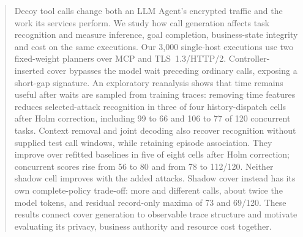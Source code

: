 \begin{abstract}
Decoy tool calls change both an LLM Agent's encrypted traffic and the work its services perform. We study how call generation affects task recognition and measure inference, goal completion, business-state integrity and cost on the same executions. Our 3,000 single-host executions use two fixed-weight planners over MCP and TLS~1.3/HTTP/2. Controller-inserted cover bypasses the model wait preceding ordinary calls, exposing a short-gap signature. An exploratory reanalysis shows that time remains useful after waits are sampled from training traces: removing time features reduces selected-attack recognition in three of four history-dispatch cells after Holm correction, including 99 to 66 and 106 to 77 of 120 concurrent tasks. Context removal and joint decoding also recover recognition without supplied test call windows, while retaining episode association. They improve over refitted baselines in five of eight cells after Holm correction; concurrent scores rise from 56 to 80 and from 78 to 112/120. Neither shadow cell improves with the added attacks. Shadow cover instead has its own complete-policy trade-off: more and different calls, about twice the model tokens, and residual record-only maxima of 73 and 69/120. These results connect cover generation to observable trace structure and motivate evaluating its privacy, business authority and resource cost together.
\end{abstract}
